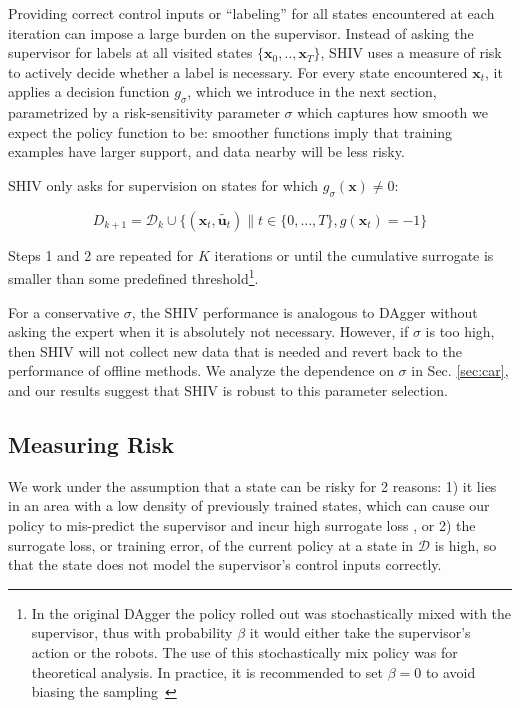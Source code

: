\documentclass[10pt, conference]{ieeeconf}      %
\newcommand{\bu}{\mathbf{u}}
\newcommand{\bx}{\mathbf{x}}
\begin{document}
Providing correct control inputs or ``labeling'' for all states encountered at each
iteration can impose a large burden on the supervisor.
Instead of asking the supervisor for labels at all visited states $\{\bx_0,..,\bx_T\}$, SHIV uses a measure of risk to actively decide whether a label is necessary. For every state encountered $\bx_t$, it applies a decision function $g_{\sigma}$, which we introduce in the next section, parametrized by a risk-sensitivity parameter $\sigma$ which captures how smooth we expect the policy function to be: smoother functions imply that training examples have larger support, and data nearby will be less risky.

SHIV only asks for supervision on states for which $g_{\sigma}(\bx) \neq 0$: 


$$D_{k+1}=\mathcal{D}_k \cup \{(\bx_t,\tilde{\bu_t})\|t\in\{0,\ldots,T\},g(\bx_t)=-1\}$$

Steps 1 and 2 are repeated for $K$ iterations or until 
the cumulative surrogate is smaller than some predefined threshold\footnote{In the original DAgger the policy rolled out
was stochastically mixed with the supervisor, thus with probability $\beta$ it would either take the supervisor's action
or the robots. The use of this stochastically mix policy was for theoretical analysis. In practice, it is recommended
to set $\beta = 0$ to avoid biasing the sampling~\cite{NIPS2014_5421,ross2010reduction}}.


 For a conservative $\sigma$, the SHIV performance is analogous to DAgger without asking the expert when it is absolutely not necessary. However, if $\sigma$ is too high, then SHIV will not collect new data that is needed and revert back to the performance of offline methods. We analyze the dependence on $\sigma$ in Sec. \ref{sec:car}, and our results suggest that SHIV is robust to this parameter selection. 

\subsection{Measuring Risk}
We work under the assumption that a state can be risky for 2 reasons: 1) it lies in an area with a low density of
previously trained states, which can cause our policy to mis-predict the supervisor and incur high surrogate
loss \cite{tokdar2010importance}, or 2) the surrogate loss, or training error, of the current policy at a state in $\mathcal{D}$ is high, so that the state does not model the supervisor's control inputs correctly. 
\end{document}
